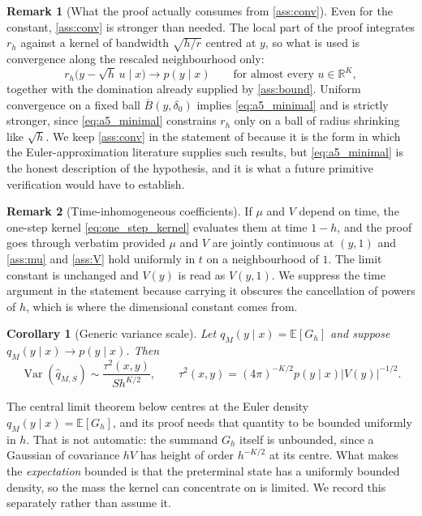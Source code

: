 \documentclass[11pt]{article}
\newtheorem{corollary}[corollary]{Corollary}
\theoremstyle{definition}
\newtheorem{remark}[remark]{Remark}
\newcommand{\R}{\mathbb{R}}
\newcommand{\E}{\mathbb{E}}
\newcommand{\Var}{\operatorname{Var}}
\begin{document}
\begin{remark}[What the proof actually consumes from \ref{ass:conv}]\label{rem:a5_minimal}
Even for the constant, \ref{ass:conv} is stronger than needed. The local part of the proof integrates $r_h$ against a kernel of bandwidth $\sqrt{h/r}$ centred at $y$, so what is used is convergence along the rescaled neighbourhood only:
\begin{equation}\label{eq:a5_minimal}
r_h\bigl(y-\sqrt h\,u\mid x\bigr)\longrightarrow p(y\mid x)
\qquad\text{for almost every }u\in\R^K ,
\end{equation}
together with the domination already supplied by \ref{ass:bound}. Uniform convergence on a fixed ball $\overline B(y,\delta_0)$ implies \eqref{eq:a5_minimal} and is strictly stronger, since \eqref{eq:a5_minimal} constrains $r_h$ only on a ball of radius shrinking like $\sqrt h$. We keep \ref{ass:conv} in the statement of  because it is the form in which the Euler-approximation literature supplies such results, but \eqref{eq:a5_minimal} is the honest description of the hypothesis, and it is what a future primitive verification would have to establish.
\end{remark}

\begin{remark}[Time-inhomogeneous coefficients]\label{rem:time_inhomogeneous}
If $\mu$ and $V$ depend on time, the one-step kernel \eqref{eq:one_step_kernel} evaluates them at time $1-h$, and the proof goes through verbatim provided $\mu$ and $V$ are jointly continuous at $(y,1)$ and \ref{ass:mu} and \ref{ass:V} hold uniformly in $t$ on a neighbourhood of $1$. The limit constant is unchanged and $V(y)$ is read as $V(y,1)$. We suppress the time argument in the statement because carrying it obscures the cancellation of powers of $h$, which is where the dimensional constant comes from.
\end{remark}

\begin{corollary}[Generic variance scale]\label{cor:generic_variance}
Let $q_M(y\mid x)=\E[G_h]$ and suppose $q_M(y\mid x)\to p(y\mid x)$. Then
\begin{equation}\label{eq:generic_variance}
\Var(\widehat q_{M,S})
\sim
\frac{\tau^2(x,y)}{S h^{K/2}},
\qquad
\tau^2(x,y)=(4\pi)^{-K/2}p(y\mid x)|V(y)|^{-1/2}.
\end{equation}
\end{corollary}

The central limit theorem below centres at the Euler density $q_M(y\mid x)=\E[G_h]$, and its proof needs that quantity to be bounded uniformly in $h$. That is not automatic: the summand $G_h$ itself is unbounded, since a Gaussian of covariance $hV$ has height of order $h^{-K/2}$ at its centre. What makes the \emph{expectation} bounded is that the preterminal state has a uniformly bounded density, so the mass the kernel can concentrate on is limited. We record this separately rather than assume it.
\end{document}
